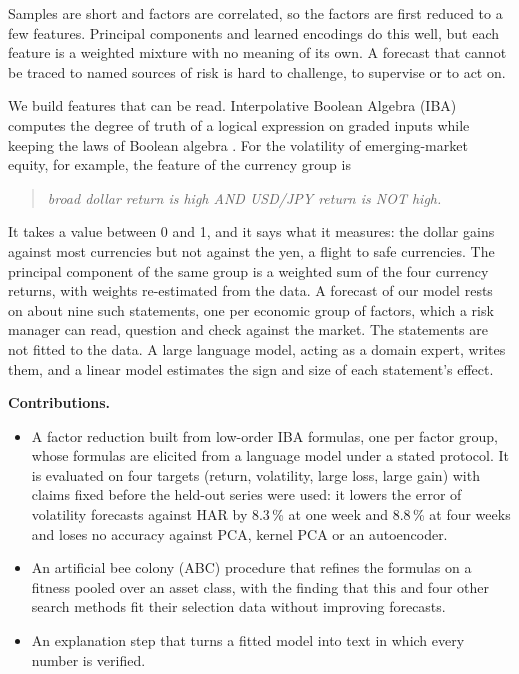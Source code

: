 \documentclass[review]{elsarticle}
\begin{document}
Samples are short and factors are correlated, so the factors are first reduced to a few features. Principal components and learned encodings do this well, but each feature is a weighted mixture with no meaning of its own. A forecast that cannot be traced to named sources of risk is hard to challenge, to supervise or to act on.

We build features that can be read. Interpolative Boolean Algebra (IBA) computes the degree of truth of a logical expression on graded inputs while keeping the laws of Boolean algebra \citep{Radojevic2008_1}. For the volatility of emerging-market equity, for example, the feature of the currency group is

\begin{quote}
\emph{broad dollar return is high AND USD/JPY return is NOT high.}
\end{quote}

It takes a value between 0 and 1, and it says what it measures: the dollar gains against most currencies but not against the yen, a flight to safe currencies. The principal component of the same group is a weighted sum of the four currency returns, with weights re-estimated from the data. A forecast of our model rests on about nine such statements, one per economic group of factors, which a risk manager can read, question and check against the market. The statements are not fitted to the data. A large language model, acting as a domain expert, writes them, and a linear model estimates the sign and size of each statement's effect.

\medskip\noindent \textbf{Contributions.}

\begin{itemize}
\item A factor reduction built from low-order IBA formulas, one per factor group, whose formulas are elicited from a language model under a stated protocol. It is evaluated on four targets (return, volatility, large loss, large gain) with claims fixed before the held-out series were used: it lowers the error of volatility forecasts against HAR by 8.3\,\% at one week and 8.8\,\% at four weeks and loses no accuracy against PCA, kernel PCA or an autoencoder.
\item An artificial bee colony (ABC) procedure that refines the formulas on a fitness pooled over an asset class, with the finding that this and four other search methods fit their selection data without improving forecasts.
\item An explanation step that turns a fitted model into text in which every number is verified.
\end{itemize}
\end{document}
